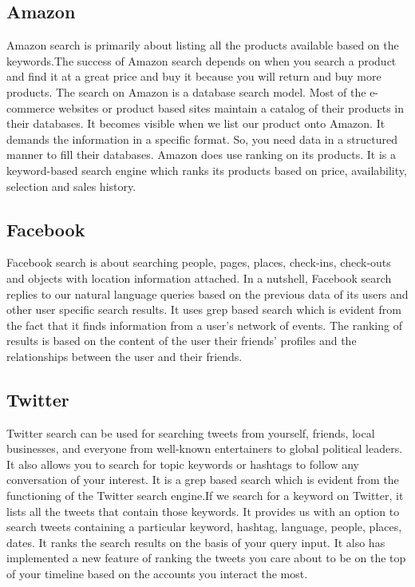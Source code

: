 \documentclass[12pt]{report}
\begin{document}
\subsection{Amazon}
Amazon search is primarily about listing all the products available based on the keywords.The success of Amazon search depends on when you search a product and find it at a great price and buy it because you will return and buy more products. \cite{1} The search on Amazon is a database search model. \cite{2} Most of the e-commerce websites or product based sites maintain a catalog of their products in their databases. It becomes visible when we list our product onto Amazon. It demands the information in a specific format. So, you need data in a structured manner to fill their databases. Amazon does use ranking on its products. It is a keyword-based search engine which ranks its products based on price, availability, selection and sales history. \cite{1}

\subsection{Facebook}
Facebook search is about searching people, pages, places, check-ins, check-outs and objects with location information attached. In a nutshell, Facebook search replies to our natural language queries based on the previous data of its users and other user specific search results. It uses grep based search which is evident from the fact that it finds information from a user's network of events. The ranking of results is based on the content of the user their friends’ profiles and the relationships between the user and their friends. \cite{3}

\subsection{Twitter}
Twitter search can be used for searching tweets from yourself, friends, local businesses, and everyone from well-known entertainers to global political leaders. It also allows you to search for topic keywords or hashtags to follow any conversation of your interest. \cite{4} It is a grep based search which is evident from the functioning of the Twitter search engine.If we search for a keyword on Twitter, it lists all the tweets that contain those keywords. It provides us with an option to search tweets containing a particular keyword, hashtag, language, people, places, dates. \cite{5} It ranks the search results on the basis of your query input. It also has implemented a new feature of ranking the tweets you care about to be on the top of your timeline based on the accounts you interact the most. \cite{6}
\end{document}
